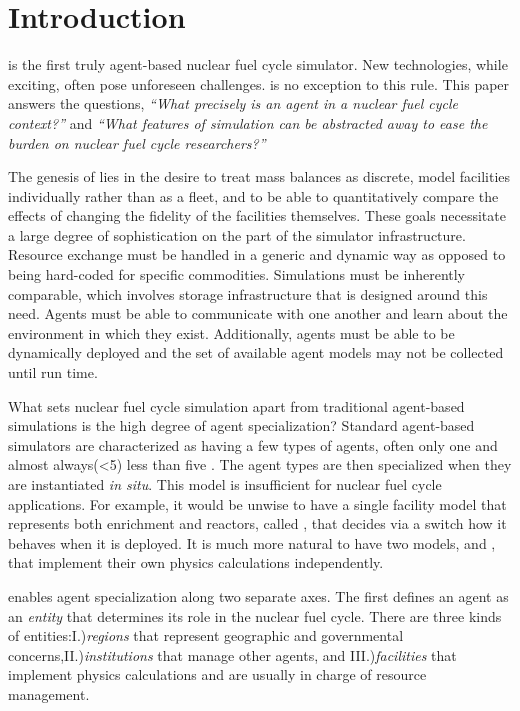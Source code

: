 \section{Introduction}
\label{sec-intro}

\Cyclus \cite{cyclus_v1_0,cyclus_v1_2,huff_fundamental_2016} is the first truly agent-based
\cite{jennings2000agent} nuclear fuel cycle simulator.
New technologies, while exciting, often pose unforeseen challenges.
\Cyclus is no exception to this rule.  This paper answers the questions,
\emph{``What precisely is an agent in a nuclear fuel cycle context?''} and
\emph{``What features of simulation can be abstracted away to ease the burden
on nuclear fuel cycle researchers?''}

The genesis of \cyclus lies in the desire to
treat mass balances as discrete, model facilities individually rather than as
a fleet, and to be able to quantitatively compare the effects of changing the
fidelity of the facilities themselves. These goals necessitate a large degree of
sophistication on the part of the simulator infrastructure.  Resource exchange
must be handled in a generic and dynamic way as opposed to being hard-coded
for specific commodities. Simulations must be inherently comparable, which involves
storage infrastructure that is designed around this need. Agents must be able
to communicate with one another and learn about the environment in which they
exist. Additionally, agents must be able to be dynamically deployed and the set of
available agent models may not be collected until run time.

What sets nuclear fuel cycle simulation apart from traditional agent-based simulations
is the high degree of agent specialization? Standard agent-based simulators
are characterized as having a few types of agents, often only one and
almost always(<5) less than five \cite{taylor2014agent}. The agent types are then
specialized
when they are instantiated \emph{in situ}. This model is insufficient for
nuclear fuel cycle applications.  For example, it would be unwise to have a single facility model
that represents both enrichment and reactors, called ,
that decides via a switch how it behaves when it is deployed. It is much
more natural to have two models,  and ,
that implement their own physics calculations independently.

\Cyclus enables agent specialization along two separate axes. The first defines
an agent as an \emph{entity} that determines its role in the
nuclear fuel cycle. There are three kinds of entities:I.)\emph{regions} that
represent geographic and governmental concerns,II.)\emph{institutions}
that manage other agents, and III.)\emph{facilities} that implement
physics calculations and are usually in charge of resource management.

